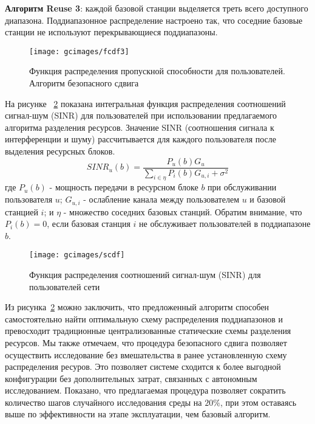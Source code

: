 \textbf{Алгоритм Reuse 3}: каждой базовой станции выделяется треть всего доступного диапазона. Поддиапазонное распределение настроено так, что соседние базовые станции не используют перекрывающиеся поддиапазоны.

\begin{figure}
    \centering
    \texttt{[image: gcimages/fcdf3]}
    \caption{Функция распределения пропускной способности для пользователей. Алгоритм безопасного сдвига}
    \label{fig:fcdf3}
\end{figure}

На рисунке ~\ref{fig:scdf} показана интегральная функция распределения соотношений сигнал-шум (SINR) для пользователей при использовании предлагаемого алгоритма разделения ресурсов. Значение SINR (соотношения сигнала к интерференции и шуму) рассчитывается для каждого пользователя после выделения ресурсных блоков.
\begin{equation}
    \label{eq:SINR}
    {SINR}_u(b) = \frac{P_u(b) G_u}{\sum_{i \in \eta} P_i(b) G_{u,i} + \sigma^2}
\end{equation}
где $P_u(b)$ - мощность передачи в ресурсном блоке $b$ при обслуживании пользователя $u$; $G_{u,i}$ - ослабление канала между пользователем $u$ и базовой станцией $i$; и $\eta$ - множество соседних базовых станций. Обратим внимание, что $P_i(b) = 0$, если базовая станция $i$ не обслуживает пользователей в поддиапазоне $b$.

\begin{figure}
    \centering
    \texttt{[image: gcimages/scdf]}
    \caption{Функция распределения соотношений сигнал-шум (SINR) для пользователей сети}
    \label{fig:scdf}
\end{figure}

Из рисунка~\ref{fig:scdf} можно заключить, что предложенный алгоритм способен самостоятельно найти оптимальную схему распределения поддиапазонов и превосходит традиционные централизованные статические схемы разделения ресурсов. Мы также отмечаем, что процедура безопасного сдвига позволяет осуществить исследование без вмешательства в ранее установленную схему распределения ресуров. Это позволяет системе сходится к более выгодной конфигурации без дополнительных затрат, связанных с автономным исследованием. Показано, что предлагаемая процедура позволяет сократить количество шагов случайного исследования среды на $20\%$, при этом оставаясь выше по эффективности на этапе эксплуатации, чем базовый алгоритм.

